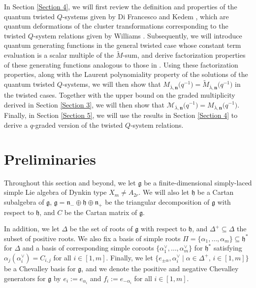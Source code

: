 \documentclass[pdftex]{sigma}
\numberwithin{equation}{section}
\begin{document}
In Section \ref{Section 4}, we will first review the definition and properties of the quantum twisted $Q$-systems given by Di Francesco and Kedem \cite{DFK24}, which are quantum deformations of the cluster transformations corresponding to the twisted $Q$-system relations given by Williams \cite{Williams15}. Subsequently, we will introduce quantum generating functions in the general twisted case whose constant term evaluation is a scalar multiple of the $\tilde{M}$-sum, and derive factorization properties of these generating functions analogous to those in \cite{DFK08, DFK14, Lin21}. Using these factorization properties, along with the Laurent polynomiality property of the solutions of the quantum twisted $Q$-systems, we will then show that $M_{\overline{ \lambda},\mathbf{n}}\bigl(q^{-1}\bigr)=\tilde{M}_{\overline{\lambda},\mathbf{n}}\bigl(q^{-1}\bigr)$ in the twisted cases. Together with the upper bound on the graded multiplicity  derived in Section \ref{Section 3}, we will then show that $\mathcal{M}_{\overline{\lambda},\mathbf{n}}\bigl(q^{-1}\bigr)=M_{\overline{\lambda},\mathbf{n}}\bigl(q^{-1}\bigr)$. Finally, in Section \ref{Section 5}, we will use the results in Section \ref{Section 4} to derive a $q$-graded version of the twisted $Q$-system relations.

\section{Preliminaries}\label{Section 2}

Throughout this section and beyond, we let $\mathfrak{g}$ be a finite-dimensional simply-laced simple Lie algebra of Dynkin type $X_m\neq A_{2r}$. We will also let $\mathfrak{h}$ be a Cartan subalgebra of $\mathfrak{g}$, $\mathfrak{g}=\mathfrak{n}_-\oplus\mathfrak{h}\oplus\mathfrak{n}_+$ be the triangular decomposition of $\mathfrak{g}$ with respect to $\mathfrak{h}$, and $C$ be the Cartan matrix of $\mathfrak{g}$.

In addition, we let $\Delta$ be the set of roots of $\mathfrak{g}$ with respect to $\mathfrak{h}$, and $\Delta^+\subseteq\Delta$ the subset of positive roots. We also fix a basis of simple roots $\Pi=\{\alpha_1,\dots,\alpha_m\}\subseteq\mathfrak{h}^*$ for $\Delta$ and a basis of corresponding simple coroots $\{\alpha_1^{\vee},\dots,\alpha_m^{\vee}\}$ for $\mathfrak{h}^*$ satisfying $\alpha_j(\alpha_i^{\vee})=C_{i,j}$ for all $i\in[1,m]$.
Finally, we let $\{e_{\pm\alpha},\alpha_i^{\vee}\mid \alpha\in\Delta^+,\,i\in[1,m]\}$ be a Chevalley basis for $\mathfrak{g}$, and we denote the positive and negative Chevalley generators for $\mathfrak{g}$ by $e_i:=e_{\alpha_i}$ and $f_i:=e_{-\alpha_i}$ for all $i\in[1,m]$.
\end{document}
